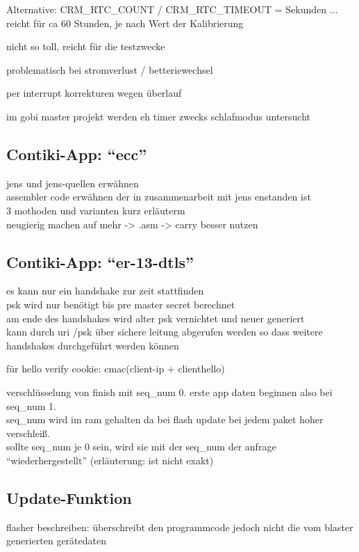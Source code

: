 Alternative: CRM\_RTC\_COUNT / CRM\_RTC\_TIMEOUT = Sekunden ... reicht für ca 60 Stunden, je nach Wert der Kalibrierung

nicht so toll, reicht für die testzwecke

problematisch bei stromverlust / betteriewechsel

per interrupt korrekturen wegen überlauf

im gobi master projekt werden eh timer zwecks schlafmodus untersucht


\subsection{Contiki-App: "`ecc"'}
jens und jens-quellen erwähnen\\
assembler code erwähnen der in zusammenarbeit mit jens enstanden ist\\
3 mothoden und varianten kurz erläuterm\\
neugierig machen auf mehr -> .asm -> carry besser nutzen

\subsection{Contiki-App: "`er-13-dtls"'}
es kann nur ein handshake zur zeit stattfinden\\
psk wird nur benötigt bis pre master secret berechnet\\
am ende des handshakes wird alter psk vernichtet und neuer generiert\\
kann durch uri /psk über sichere leitung abgerufen werden so dass weitere handshakes durchgeführt werden können

für hello verify cookie: cmac(client-ip + clienthello)

verschlüsselung von finish mit seq\_num 0. erste app daten beginnen also bei seq\_num 1.\\
seq\_num wird im ram gehalten da bei flash update bei jedem paket hoher verschleiß.\\
sollte seq\_num je 0 sein, wird sie mit der seq\_num der anfrage "`wiederhergestellt"' (erläuterung: ist nicht exakt)

\subsection{Update-Funktion}
flasher beschreiben: überschreibt den programmcode jedoch nicht die vom blaster generierten gerätedaten